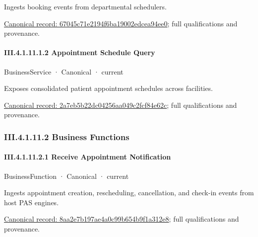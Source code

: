 Ingests booking events from departmental schedulers.


{\footnotesize \href{../../../../../../../continuum/business/business-service/67045c71e2194f6ba19002edcea94ee0.md}{Canonical record: 67045c71e2194f6ba19002edcea94ee0}; full qualifications and provenance.}\par
\paragraph*{III.4.1.11.1.2 Appointment Schedule Query}
\label{navigation:III.4.1.11.1.2}

\label{element:2a7eb5b22dc04256aa049c2fcf84e62c}
{\small BusinessService · Canonical · current}\par

Exposes consolidated patient appointment schedules across facilities.


{\footnotesize \href{../../../../../../../continuum/business/business-service/2a7eb5b22dc04256aa049c2fcf84e62c.md}{Canonical record: 2a7eb5b22dc04256aa049c2fcf84e62c}; full qualifications and provenance.}\par
\subsubsection*{III.4.1.11.2 Business Functions}
\label{navigation:III.4.1.11.2}

\paragraph*{III.4.1.11.2.1 Receive Appointment Notification}
\label{navigation:III.4.1.11.2.1}

\label{element:8aa2e7b197ae4a0c99b654b9f1a312e8}
{\small BusinessFunction · Canonical · current}\par

Ingests appointment creation, rescheduling, cancellation, and check-in events from host PAS engines.


{\footnotesize \href{../../../../../../../continuum/business/business-function/8aa2e7b197ae4a0c99b654b9f1a312e8.md}{Canonical record: 8aa2e7b197ae4a0c99b654b9f1a312e8}; full qualifications and provenance.}\par
